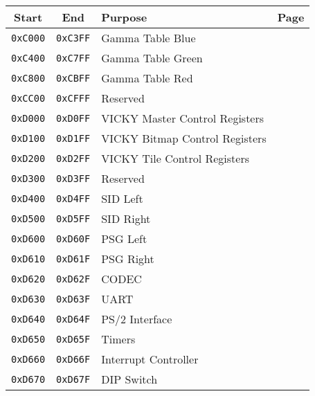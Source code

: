 \begin{table}[ht]
    \begin{center}
        \begin{tabular}{|c|c|l|l|} \hline
            Start & End & Purpose & Page \\ \hline \hline
            \verb+0xC000+ & \verb+0xC3FF+ & Gamma Table Blue & \multirow{3}{*}{\pageref{sec:gamma}} \\ \cline{1-3}
            \verb+0xC400+ & \verb+0xC7FF+ & Gamma Table Green & \\ \cline{1-3}
            \verb+0xC800+ & \verb+0xCBFF+ & Gamma Table Red & \\ \hline
            \verb+0xCC00+ & \verb+0xCFFF+ & Reserved & \\ \hline
            \verb+0xD000+ & \verb+0xD0FF+ & VICKY Master Control Registers & \pageref{tab:vky_master_ctrl_reg}\\ \hline
            \verb+0xD100+ & \verb+0xD1FF+ & VICKY Bitmap Control Registers & \pageref{tab:bm_registers} \\ \hline
            \verb+0xD200+ & \verb+0xD2FF+ & VICKY Tile Control Registers & \pageref{tab:tilemap_reg} \\ \hline
            \verb+0xD300+ & \verb+0xD3FF+ & Reserved & \\ \hline
            \verb+0xD400+ & \verb+0xD4FF+ & SID Left & \multirow{2}{*}{\pageref{tab:sid_registers}} \\ \cline{1-3}
            \verb+0xD500+ & \verb+0xD5FF+ & SID Right & \\ \hline
            \verb+0xD600+ & \verb+0xD60F+ & PSG Left & \multirow{2}{*}{\pageref{tab:psg_registers}} \\ \cline{1-3}
            \verb+0xD610+ & \verb+0xD61F+ & PSG Right & \\ \hline
            \verb+0xD620+ & \verb+0xD62F+ & CODEC & \pageref{tab:codec_registers} \\ \hline
            \verb+0xD630+ & \verb+0xD63F+ & UART & \pageref{tab:uart_reg} \\ \hline
            \verb+0xD640+ & \verb+0xD64F+ & PS/2 Interface & \pageref{tab:ps2_reg} \\ \hline
            \verb+0xD650+ & \verb+0xD65F+ & Timers & \pageref{tab:timer_reg} \\ \hline
            \verb+0xD660+ & \verb+0xD66F+ & Interrupt Controller & \pageref{tab:interrupts} \\ \hline
            \verb+0xD670+ & \verb+0xD67F+ & DIP Switch & \pageref{tab:dip_reg} \\ \hline

\end{tabular}
\end{center}
\end{table}
